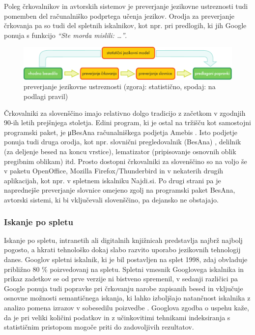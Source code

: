 \begin{multicols}{2}
Poleg črkovalnikov in avtorskih sistemov je preverjanje jezikovne ustreznosti tudi pomemben del računalniško podprtega učenja jezikov. Orodja za preverjanje črkovanja pa so tudi del spletnih iskalnikov, kot npr. pri predlogih, ki jih Google ponuja s funkcijo \textit{“Ste morda mislili: …”}.


\begin{figure}[htb]
  \center
  \includegraphics[width=\textwidth]{../_media/slovene/language_checking}
  \caption{preverjanje jezikovne ustreznosti (zgoraj: statistično, spodaj: na podlagi pravil)}
  \label{fig:langcheckingaarch_de}
\end{figure}

Črkovalniki za slovenščino imajo relativno dolgo tradicijo z začetkom v zgodnjih 90-ih letih prejšnjega stoletja. Edini program, ki je ostal na tržišču kot samostojni programski paket, je μBesAna računalniškega podjetja Amebis  \cite{Amb1}. Isto podjetje ponuja tudi druga orodja, kot npr. slovnični pregledovalnik (BesAna) \cite{Amb2}, delilnik (za deljenje besed na koncu vrstice), lematizator (pripisovanje osnovnih oblik pregibnim oblikam) itd.  Prosto dostopni črkovalniki za slovenščino so na voljo še v paketu OpenOffice, Mozilla Firefox/Thunderbird in v nekaterih drugih aplikacijah, kot npr. v spletnem iskalniku Najdi.si.\- Po drugi strani pa je naprednejše preverjanje slovnice omejeno zgolj na programski paket BesAna, avtorski sistemi, ki bi vključevali slovenščino, pa dejansko ne obstajajo.

\subsubsection{Iskanje po spletu}

Iskanje po spletu, intranetih ali digitalnih knjižnicah predstavlja najbrž najbolj pogosto, a hkrati tehnološko dokaj slabo razvito uporabo jezikovnih tehnologij danes. Googlov spletni iskalnik, ki je bil postavljen na splet 1998, zdaj obvladuje približno 80 \% poizvedovanj na spletu. Spletni vmesnik Googlovega iskalnika in prikaz zadetkov se od prve verzije ni bistveno spremenil, v sedanji različici pa Google ponuja tudi popravke pri črkovanju narobe zapisanih besed in vključuje osnovne možnosti semantičnega iskanja, ki lahko izboljšajo natančnost iskalnika z analizo pomena izrazov v sobesedilu poizvedbe \cite{pc1}.  Googlova zgodba o uspehu kaže, da je pri veliki količini podatkov in z učinkovitimi tehnikami indeksiranja s statističnim pristopom mogoče priti do zadovoljivih rezultatov.


\end{multicols}
